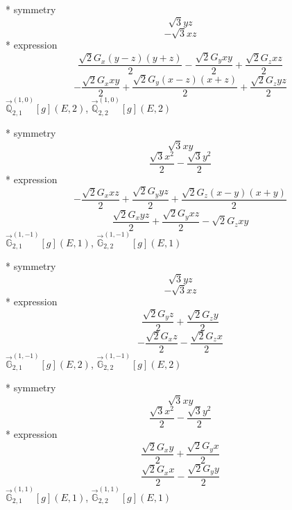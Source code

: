 \documentclass[fleqn,8pt]{jsarticle}
\begin{document}
\noindent\quad ** symmetry
\begin{dmath*}
\sqrt{3} y z
\end{dmath*}
\begin{dmath*}
- \sqrt{3} x z
\end{dmath*}
\noindent\quad ** expression
\begin{dmath*}
\frac{\sqrt{2} G_{x} \left(y - z\right) \left(y + z\right)}{2} - \frac{\sqrt{2} G_{y} x y}{2} + \frac{\sqrt{2} G_{z} x z}{2}
\end{dmath*}
\begin{dmath*}
- \frac{\sqrt{2} G_{x} x y}{2} + \frac{\sqrt{2} G_{y} \left(x - z\right) \left(x + z\right)}{2} + \frac{\sqrt{2} G_{z} y z}{2}
\end{dmath*}
\noindent\quad $\vec{\mathbb{Q}}_{2,1}^{(1,0)}[g](E,2)$, $\vec{\mathbb{Q}}_{2,2}^{(1,0)}[g](E,2)$

\noindent\quad ** symmetry
\begin{dmath*}
\sqrt{3} x y
\end{dmath*}
\begin{dmath*}
\frac{\sqrt{3} x^{2}}{2} - \frac{\sqrt{3} y^{2}}{2}
\end{dmath*}
\noindent\quad ** expression
\begin{dmath*}
- \frac{\sqrt{2} G_{x} x z}{2} + \frac{\sqrt{2} G_{y} y z}{2} + \frac{\sqrt{2} G_{z} \left(x - y\right) \left(x + y\right)}{2}
\end{dmath*}
\begin{dmath*}
\frac{\sqrt{2} G_{x} y z}{2} + \frac{\sqrt{2} G_{y} x z}{2} - \sqrt{2} G_{z} x y
\end{dmath*}
\noindent\quad $\vec{\mathbb{G}}_{2,1}^{(1,-1)}[g](E,1)$, $\vec{\mathbb{G}}_{2,2}^{(1,-1)}[g](E,1)$

\noindent\quad ** symmetry
\begin{dmath*}
\sqrt{3} y z
\end{dmath*}
\begin{dmath*}
- \sqrt{3} x z
\end{dmath*}
\noindent\quad ** expression
\begin{dmath*}
\frac{\sqrt{2} G_{y} z}{2} + \frac{\sqrt{2} G_{z} y}{2}
\end{dmath*}
\begin{dmath*}
- \frac{\sqrt{2} G_{x} z}{2} - \frac{\sqrt{2} G_{z} x}{2}
\end{dmath*}
\noindent\quad $\vec{\mathbb{G}}_{2,1}^{(1,-1)}[g](E,2)$, $\vec{\mathbb{G}}_{2,2}^{(1,-1)}[g](E,2)$

\noindent\quad ** symmetry
\begin{dmath*}
\sqrt{3} x y
\end{dmath*}
\begin{dmath*}
\frac{\sqrt{3} x^{2}}{2} - \frac{\sqrt{3} y^{2}}{2}
\end{dmath*}
\noindent\quad ** expression
\begin{dmath*}
\frac{\sqrt{2} G_{x} y}{2} + \frac{\sqrt{2} G_{y} x}{2}
\end{dmath*}
\begin{dmath*}
\frac{\sqrt{2} G_{x} x}{2} - \frac{\sqrt{2} G_{y} y}{2}
\end{dmath*}
\noindent\quad $\vec{\mathbb{G}}_{2,1}^{(1,1)}[g](E,1)$, $\vec{\mathbb{G}}_{2,2}^{(1,1)}[g](E,1)$
\end{document}
